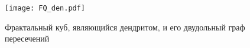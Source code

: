 \begin{figure}[H]
    \centering
\texttt{[image: FQ\_den.pdf]}
    \caption{Фрактальный куб, являющийся дендритом, и его двудольный граф пересечений}
    \label{fig:BMM2022}
\end{figure}

% 
%
